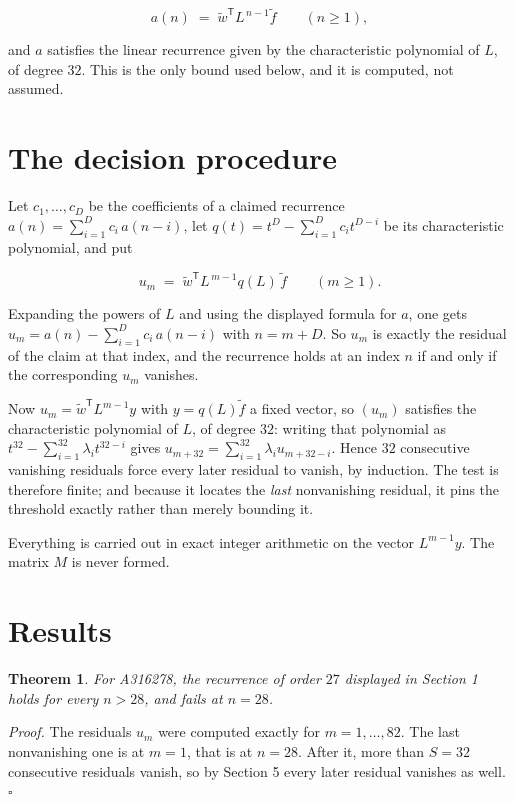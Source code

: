 \documentclass[11pt]{article}
\newtheorem{theorem}{Theorem}
\theoremstyle{definition}
\begin{document}
\[a(n) \;=\; \tilde w^{\mathsf T} L^{\,n-1} \tilde f \qquad (n \ge 1),\]

and $a$ satisfies the linear recurrence given by the characteristic polynomial of $L$, of degree $32$. This is the only bound used below, and it is computed, not assumed.

\section{The decision procedure}

Let $c_1,\dots,c_D$ be the coefficients of a claimed recurrence $a(n) = \sum_{i=1}^{D} c_i\,a(n-i)$, let $q(t) = t^{D} - \sum_{i=1}^{D} c_i t^{D-i}$ be its characteristic polynomial, and put

\[u_m \;=\; \tilde w^{\mathsf T} L^{\,m-1} q(L)\,\tilde f \qquad (m \ge 1).\]

Expanding the powers of $L$ and using the displayed formula for $a$, one gets $u_m = a(n) - \sum_{i=1}^{D} c_i\,a(n-i)$ with $n = m + D$. So $u_m$ is exactly the residual of the claim at that index, and the recurrence holds at an index $n$ if and only if the corresponding $u_m$ vanishes.

Now $u_m = \tilde w^{\mathsf T} L^{m-1} y$ with $y = q(L)\tilde f$ a fixed vector, so $(u_m)$ satisfies the characteristic polynomial of $L$, of degree $32$: writing that polynomial as $t^{32} - \sum_{i=1}^{32} \lambda_i t^{32-i}$ gives $u_{m+32} = \sum_{i=1}^{32} \lambda_i u_{m+32-i}$. Hence $32$ consecutive vanishing residuals force every later residual to vanish, by induction. The test is therefore finite; and because it locates the {\itshape last} nonvanishing residual, it pins the threshold exactly rather than merely bounding it.

Everything is carried out in exact integer arithmetic on the vector $L^{m-1}y$. The matrix $M$ is never formed.

\section{Results}

\begin{theorem} For A316278, the recurrence of order $27$ displayed in Section 1 holds for every $n > 28$, and fails at $n = 28$.\end{theorem}

{\itshape Proof.} The residuals $u_m$ were computed exactly for $m = 1,\dots,82$. The last nonvanishing one is at $m = 1$, that is at $n = 28$. After it, more than $S = 32$ consecutive residuals vanish, so by Section 5 every later residual vanishes as well. $\square$
\end{document}
